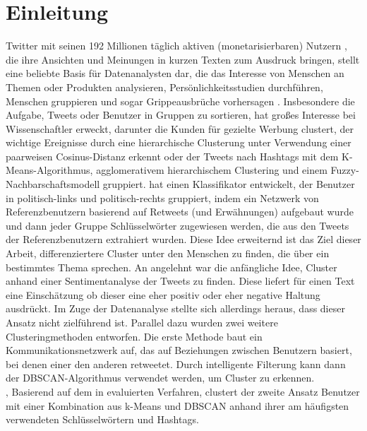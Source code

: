 \chapter{Einleitung}
\label{chap:einleitung}
Twitter mit seinen 192 Millionen täglich aktiven (monetarisierbaren) Nutzern \cite{twitter-mdau}, die ihre Ansichten und Meinungen in kurzen Texten zum Ausdruck bringen, stellt eine beliebte Basis für Datenanalysten dar, die das Interesse von Menschen an Themen oder Produkten analysieren, Persönlichkeitsstudien durchführen, Menschen gruppieren und sogar Grippeausbrüche vorhersagen \cite{Achrekar2011}.
Insbesondere die Aufgabe, Tweets oder Benutzer in Gruppen zu sortieren, hat großes Interesse bei Wissenschaftler erweckt, darunter \cite{Friedemann2015C} die Kunden für gezielte Werbung  clustert, \cite{Ifrim2014}  der wichtige Ereignisse durch eine hierarchische Clusterung unter Verwendung einer paarweisen Cosinus-Distanz erkennt oder \cite{Miyamoto2021} der Tweets nach Hashtags mit dem K-Means-Algorithmus, agglomerativem hierarchischem Clustering und einem Fuzzy-Nachbarschaftsmodell gruppiert.
\cite{Conover2011-2} hat einen Klassifikator entwickelt, der Benutzer in politisch-links und politisch-rechts gruppiert, indem ein Netzwerk von Referenzbenutzern basierend auf Retweets (und Erwähnungen) aufgebaut wurde und dann jeder Gruppe Schlüsselwörter zugewiesen werden, die aus den Tweets der Referenzbenutzern extrahiert wurden.
Diese Idee erweiternd ist das Ziel dieser Arbeit, differenziertere Cluster unter den Menschen zu finden, die über ein bestimmtes Thema sprechen.
An \cite{Kharde2016} angelehnt war die anfängliche Idee, Cluster anhand einer Sentimentanalyse der Tweets zu finden. Diese liefert für einen Text eine Einschätzung ob dieser eine eher positiv oder eher negative Haltung ausdrückt.
Im Zuge der Datenanalyse stellte sich allerdings heraus, dass dieser Ansatz nicht zielführend ist.
Parallel dazu wurden zwei weitere Clusteringmethoden entworfen. 
Die erste Methode baut ein Kommunikationsnetzwerk auf, das auf Beziehungen zwischen Benutzern basiert, bei denen einer den anderen retweetet. Durch intelligente Filterung kann dann der DBSCAN-Algorithmus verwendet werden, um Cluster zu erkennen.\\‚
Basierend auf dem in \cite{Godfrey2014} evaluierten Verfahren, clustert der zweite Ansatz Benutzer mit einer Kombination aus k-Means und DBSCAN anhand ihrer am häufigsten verwendeten Schlüsselwörtern und Hashtags.\\
